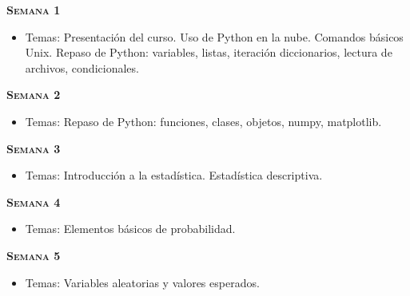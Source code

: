 \documentclass[letterpaper,10pt,onecolumn]{article}
\begin{document}

\noindent\textbf{\textsc{Semana 1}}\\[-0.5cm]
\begin{itemize}
\item Temas: 
Presentaci\'on del curso. Uso de Python en la nube. Comandos b\'asicos Unix. 
Repaso de Python: variables, listas, iteraci\'on diccionarios, lectura
de archivos, condicionales.\\[-0.6cm] 
\end{itemize}


\noindent\textbf{\textsc{Semana 2}} \\[-0.5cm]
\begin{itemize}
\item Temas: 
Repaso de Python: funciones, clases, objetos, numpy, matplotlib. \\[-0.6cm] 
\end{itemize}

\noindent\textbf{\textsc{Semana 3}}\\[-0.5cm]
\begin{itemize}
\item Temas:  
Introducci\'on a la estad\'istica. Estad\'istica descriptiva.
\\[-0.6cm]  
\end{itemize}

\noindent\textbf{\textsc{Semana 4}}\\[-0.5cm]
\begin{itemize}
\item Temas:  Elementos b\'asicos de probabilidad. 
\\[-0.6cm] 
\end{itemize}

\noindent\textbf{\textsc{Semana 5}}\\[-0.5cm]
\begin{itemize}
\item Temas: Variables aleatorias y valores esperados.
  \\[-0.6cm] 
\end{itemize}
\end{document}
